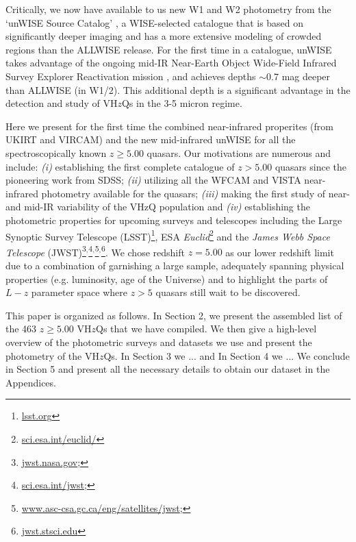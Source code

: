 \documentclass[usenatbib]{mnras}
\begin{document}
Critically, we now have available to us new W1 and W2 photometry from
the `unWISE Source Catalog' \citep[][]{Schlafly_Meisner2018}, a
WISE-selected catalogue that is based on significantly deeper imaging
and has a more extensive modeling of crowded regions than the ALLWISE
release. For the first time in a catalogue, unWISE takes advantage of
the ongoing mid-IR Near-Earth Object Wide-Field Infrared Survey
Explorer Reactivation mission \citep[NEOWISE-R; ][]{Mainzer2014}, and
achieves depths $\sim$0.7 mag deeper than ALLWISE (in W1/2).  This
additional depth is a significant advantage in the detection and study
of VH$z$Qs in the 3-5 micron regime.

Here we present for the first time the combined near-infrared properites (from UKIRT and VIRCAM) and the new mid-infrared unWISE for all the spectroscopically known $z\geq5.00$ quasars. Our motivations are numerous and include: {\it (i)} establishing the first complete catalogue of $z>5.00$ quasars since the pioneering work from SDSS; {\it (ii)} utilizing all the WFCAM and VISTA near-infrared photometry available for the quasars; {\it (iii)} making the first study of near- and mid-IR variability of the VHzQ population and {\it (iv)} establishing the photometric properties for upcoming surveys and telescopes including the Large Synoptic Survey Telescope (LSST)\footnote{\href{https://www.lsst.org}{{lsst.org}}}, ESA {\it Euclid}\footnote{\href{https://sci.esa.int/euclid/}{sci.esa.int/euclid/}} and the {\it James Webb Space Telescope} (JWST)\footnote{\href{https://www.jwst.nasa.gov/}{jwst.nasa.gov};}$^,$\footnote{\href{https://sci.esa.int/jwst/}{sci.esa.int/jwst};}$^,$\footnote{\href{https://www.asc-csa.gc.ca/eng/satellites/jwst/}{www.asc-csa.gc.ca/eng/satellites/jwst};}$^,$\footnote{\href{https://jwst.stsci.edu/}{jwst.stsci.edu}}. We chose redshift $z=5.00$ as our lower redshift limit due to a combination of garnishing a large sample, adequately spanning physical properties (e.g. luminosity, age of the Universe) and to highlight the parts of $L-z$ parameter space where $z>5$ quasars still wait to be discovered. 

This paper is organized as follows.  In Section 2, we present the assembled list of the 463 $z\geq5.00$ VH$z$Qs that we have compiled. We then give a high-level overview of the photometric surveys and datasets we use and present the photometry of the VH$z$Qs. In Section 3 we ... and In Section 4 we ... We conclude in Section 5 and present all the necessary details to obtain our dataset in the Appendices. 
\end{document}
